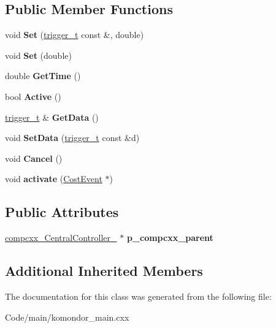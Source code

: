 \subsection*{Public Member Functions}
\begin{DoxyCompactItemize}
\item 
\mbox{\label{classcompcxx__Timer__21_abc7a7464c16fbb360e74acfd3e38a395}} 
void {\bfseries Set} (\hyperlink{classtrigger__t}{trigger\+\_\+t} const \&, double)
\item 
\mbox{\label{classcompcxx__Timer__21_aacdf5f8df7d954948f656109438de37c}} 
void {\bfseries Set} (double)
\item 
\mbox{\label{classcompcxx__Timer__21_ac23543f9ec46482859efeb6c2e890a1a}} 
double {\bfseries Get\+Time} ()
\item 
\mbox{\label{classcompcxx__Timer__21_af28073033d996abb5e570a3e0dc3a0b3}} 
bool {\bfseries Active} ()
\item 
\mbox{\label{classcompcxx__Timer__21_a3722004e3dc846326c343dd80f5008c2}} 
\hyperlink{classtrigger__t}{trigger\+\_\+t} \& {\bfseries Get\+Data} ()
\item 
\mbox{\label{classcompcxx__Timer__21_ad7c8fe681b70eb7d17abe31789f0c569}} 
void {\bfseries Set\+Data} (\hyperlink{classtrigger__t}{trigger\+\_\+t} const \&d)
\item 
\mbox{\label{classcompcxx__Timer__21_a8cd0fc84c3b7af9eaba2650a469613ae}} 
void {\bfseries Cancel} ()
\item 
\mbox{\label{classcompcxx__Timer__21_a283f0689f0e4678ff2e6adf2d398b43f}} 
void {\bfseries activate} (\hyperlink{structCostEvent}{Cost\+Event} $\ast$)
\end{DoxyCompactItemize}
\subsection*{Public Attributes}
\begin{DoxyCompactItemize}
\item 
\mbox{\label{classcompcxx__Timer__21_a498b85c8aac6e24bbfa2576bca6057f5}} 
\hyperlink{classcompcxx__CentralController__26}{compcxx\+\_\+\+Central\+Controller\+\_} $\ast$ {\bfseries p\+\_\+compcxx\+\_\+parent}
\end{DoxyCompactItemize}
\subsection*{Additional Inherited Members}


The documentation for this class was generated from the following file\+:\begin{DoxyCompactItemize}
\item 
Code/main/komondor\+\_\+main.\+cxx\end{DoxyCompactItemize}

